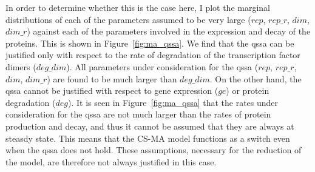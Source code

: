 In order to determine whether this is the case here, I plot the marginal distributions of each of the parameters assumed to be very large ($rep$, $rep\_r$, $dim$, $dim\_r$) against each of the parameters involved in the expression and decay of the proteins. This is shown in Figure~\ref{fig:ma_qssa}. We find that the \acrshort{qssa} can be justified only with respect to the rate of degradation of the transcription factor dimers ($deg\_dim$). All parameters under consideration for the \acrshort{qssa} ($rep$, $rep\_r$, $dim$, $dim\_r$) are found to be much larger than $deg\_dim$. On the other hand, the \acrshort{qssa} cannot be justified with respect to gene expression ($ge$) or protein degradation ($deg$). It is seen in Figure~\ref{fig:ma_qssa} that the rates under consideration for the \acrshort{qssa} are not much larger than the rates of protein production and decay, and thus it cannot be assumed that they are always at steasdy state. This means that the CS-MA model functions as a switch even when the \acrshort{qssa} does not hold. These assumptions, necessary for the reduction of the model, are therefore not always justified in this case. 





